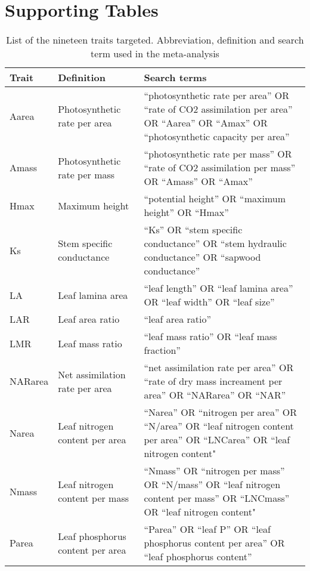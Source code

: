 \documentclass[10pt,twoside]{article}\usepackage[]{graphicx}\usepackage[]{color}
\begin{document}
\clearpage

\section{Supporting Tables}\label{app:supp_info_table}

\linespread{1}

\begin{table}[h!]
\centering
\caption{List of the nineteen traits targeted. Abbreviation,
definition and search term used in the meta-analysis}
\label{tab:lit_search}
\vspace{0.5cm}
{\footnotesize
\begin{tabular}{p{3cm}p{3cm}p{8cm}}
  \hline
Trait & Definition & Search terms \\
  \hline
Aarea & Photosynthetic rate per area & ``photosynthetic rate per area'' OR ``rate of CO2 assimilation per area'' OR ``Aarea'' OR ``Amax'' OR ``photosynthetic capacity per area'' \\
  Amass & Photosynthetic rate per mass & ``photosynthetic rate per mass'' OR ``rate of CO2 assimilation per mass'' OR ``Amass'' OR ``Amax'' \\
  Hmax & Maximum height & ``potential height'' OR ``maximum height'' OR ``Hmax'' \\
  Ks & Stem specific conductance & ``Ks'' OR ``stem specific conductance'' OR ``stem hydraulic conductance'' OR ``sapwood conductance'' \\
  LA & Leaf lamina area & ``leaf length'' OR ``leaf lamina area'' OR ``leaf width'' OR ``leaf size'' \\
  LAR & Leaf area ratio & ``leaf area ratio'' \\
  LMR & Leaf mass ratio & ``leaf mass ratio'' OR ``leaf mass fraction'' \\
  NARarea & Net assimilation rate per area &  ``net assimilation rate per area'' OR ``rate of dry mass increament per area'' OR ``NARarea'' OR ``NAR'' \\
  Narea & Leaf nitrogen content per area & ``Narea'' OR ``nitrogen per area'' OR ``N/area'' OR ``leaf nitrogen content per area'' OR ``LNCarea'' OR ``leaf nitrogen content" \\
  Nmass & Leaf nitrogen content per mass & ``Nmass'' OR ``nitrogen per mass'' OR ``N/mass'' OR ``leaf nitrogen content per mass'' OR ``LNCmass'' OR ``leaf nitrogen content" \\
  Parea & Leaf phosphorus content per area & ``Parea'' OR ``leaf P'' OR  ``leaf phosphorus content per area''  OR ``leaf phosphorus content'' \\

\end{tabular}}
\end{table}
\end{document}
